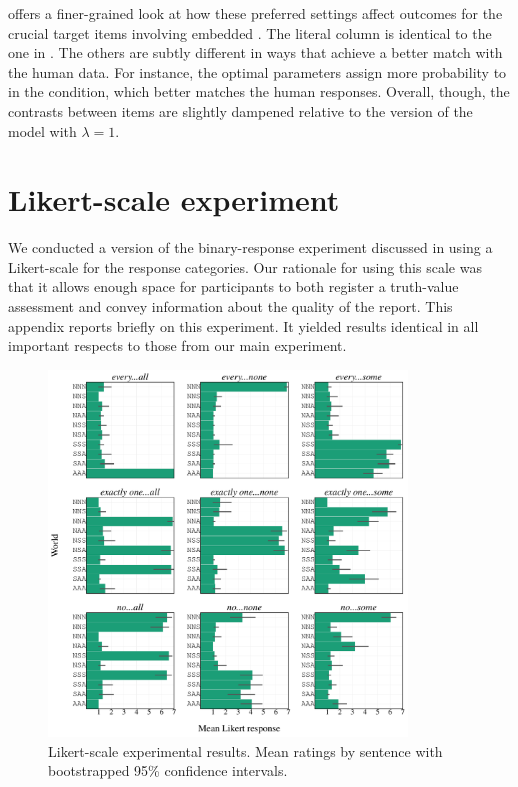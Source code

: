 \documentclass[leqno,12pt]{article}
\begin{document}
\begin{appendix}
 offers a finer-grained look at how these
preferred settings affect outcomes for the crucial target items
involving embedded . The literal column is identical to the
one in . The others are subtly different in
ways that achieve a better match with the human data. For instance,
the optimal parameters assign more probability to  in the
 condition, which better matches the human
responses. Overall, though, the contrasts between items are slightly dampened
relative to the version of the model with $\lambda=1$.



\section{Likert-scale experiment}\label{app:likert}

We conducted a version of the binary-response experiment discussed in
 using a Likert-scale for the response categories.
Our rationale for using this scale was that it allows enough space for
participants to both register a truth-value assessment and convey
information about the quality of the report. This appendix reports
briefly on this experiment. It yielded results identical in all
important respects to those from our main experiment.

\begin{figure}[t]
  \centering
  \includegraphics[width=0.85\textwidth]{fig/embeddedscalars-experiment-results-likert}
  \caption{Likert-scale experimental results. Mean ratings by sentence with bootstrapped 95\% confidence intervals.}
  \label{fig:likert:results}
\end{figure}


\end{appendix}
\end{document}
